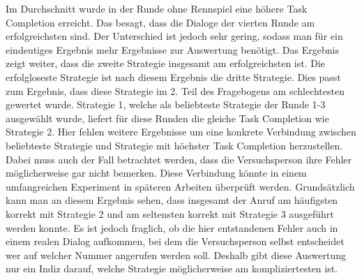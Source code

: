 \documentclass[12pt,a4paper]{scrartcl}
\begin{document}
Im Durchschnitt wurde in der Runde ohne Rennspiel eine höhere Task Completion erreicht. Das besagt, dass die Dialoge der vierten Runde am erfolgreichsten sind. Der Unterschied ist jedoch sehr gering, sodass man für ein eindeutiges Ergebnis mehr Ergebnisse zur Auswertung benötigt. Das Ergebnis zeigt weiter, dass die zweite Strategie insgesamt am erfolgreichsten ist. Die erfolgloseste Strategie ist nach diesem Ergebnis die dritte Strategie. Dies passt zum Ergebnis, dass diese Strategie im 2. Teil des Fragebogens am schlechtesten gewertet wurde. Strategie 1, welche als beliebteste Strategie der Runde 1-3 ausgewählt wurde, liefert für diese Runden die gleiche Task Completion wie Strategie 2. Hier fehlen weitere Ergebnisse um eine konkrete Verbindung zwischen beliebteste Strategie und Strategie mit höchster Task Completion herzustellen. Dabei muss auch der Fall betrachtet werden, dass die Versuchsperson ihre Fehler möglicherweise gar nicht bemerken. Diese Verbindung könnte in einem umfangreichen Experiment in späteren Arbeiten überprüft werden. 
Grundsätzlich kann man an diesem Ergebnis sehen, dass insgesamt der Anruf am häufigsten korrekt mit Strategie 2 und am seltensten korrekt mit Strategie 3 ausgeführt werden konnte. \newline
Es ist jedoch fraglich, ob die hier entstandenen Fehler auch in einem realen Dialog aufkommen, bei dem die Versuchsperson selbst entscheidet wer auf welcher Nummer angerufen werden soll. Deshalb gibt diese Auswertung nur ein Indiz darauf, welche Strategie möglicherweise am kompliziertesten ist. 
\end{document}
